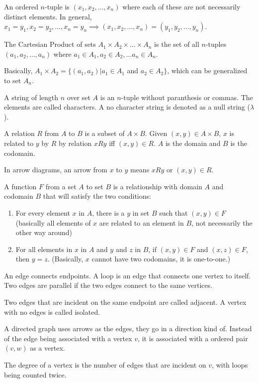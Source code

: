 \documentclass[../discrete.tex]{subfiles}
\begin{document}
An ordered $n$-tuple is $(x_1,x_2,\dots,x_n)$ where each of these are not necessarily distinct elements. In general, $x_1=y_1, x_2=y_2,\dots,x_n=y_n\implies (x_1,x_2,\dots,x_n)=(y_1,y_2,\dots,y_n)$.

The Cartesian Product of sets $A_1\times A_2\times \dots \times A_n$ is the set of all $n$-tuples $(a_1,a_2,\dots,a_n)$ where $a_1\in A_1, a_2\in A_2, \dots a_n\in A_n$. 

Basically, $A_1\times A_2 = \{ (a_1,a_2)|a_1\in A_1$ and $a_2\in A_2\}$, which can be generalized to set $A_n$.

A string of length $n$ over set $A$ is an $n$-tuple without paranthesis or commas. The elements are called characters. A no character string is denoted as a null string ($\lambda$).

A relation $R$ from $A$ to $B$ is a subset of $A\times B$. Given $(x,y)\in A\times B$, $x$ is related to $y$ by $R$ by relation $x R y$ iff $(x,y)\in R$. $A$ is the domain and $B$ is the codomain.

In arrow diagrams, an arrow from $x$ to $y$ means $xRy$ or $(x,y)\in R$.

A function $F$ from a set $A$ to set $B$ is a relationship with domain $A$ and codomain $B$ that will satisfy the two conditions:
\begin{enumerate}
    \item For every element $x$ in $A$, there is a $y$ in set $B$ such that $(x,y)\in F$ (basically all elements of $x$ are related to an element in $B$, not necessarily the other way around)
    \item For all elements in $x$ in $A$ and $y$ and $z$ in $B$, if $(x,y)\in F$ and $(x,z)\in F$, then $y=z$. (Basically, $x$ cannot have two codomains, it is one-to-one.)
\end{enumerate}

An edge connects endpoints. A loop is an edge that connects one vertex to itself. Two edges are parallel if the two edges connect to the same vertices.

Two edges that are incident on the same endpoint are called adjacent. A vertex with no edges is called isolated.

A directed graph uses arrows as the edges, they go in a direction kind of. Instead of the edge being associated with a vertex $v$, it is associated with a ordered pair $(v,w)$ as a vertex.

The degree of a vertex is the number of edges that are incident on $v$, with loops being counted twice.
\end{document}
